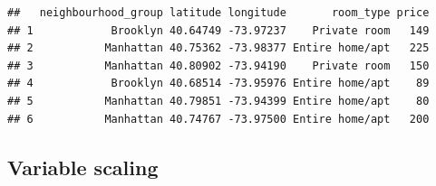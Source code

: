 \documentclass[
]{article}
\begin{document}
\begin{verbatim}
##   neighbourhood_group latitude longitude       room_type price
## 1            Brooklyn 40.64749 -73.97237    Private room   149
## 2           Manhattan 40.75362 -73.98377 Entire home/apt   225
## 3           Manhattan 40.80902 -73.94190    Private room   150
## 4            Brooklyn 40.68514 -73.95976 Entire home/apt    89
## 5           Manhattan 40.79851 -73.94399 Entire home/apt    80
## 6           Manhattan 40.74767 -73.97500 Entire home/apt   200
\end{verbatim}

\hypertarget{variable-scaling}{%
\subsection{Variable scaling}\label{variable-scaling}}
\end{document}
